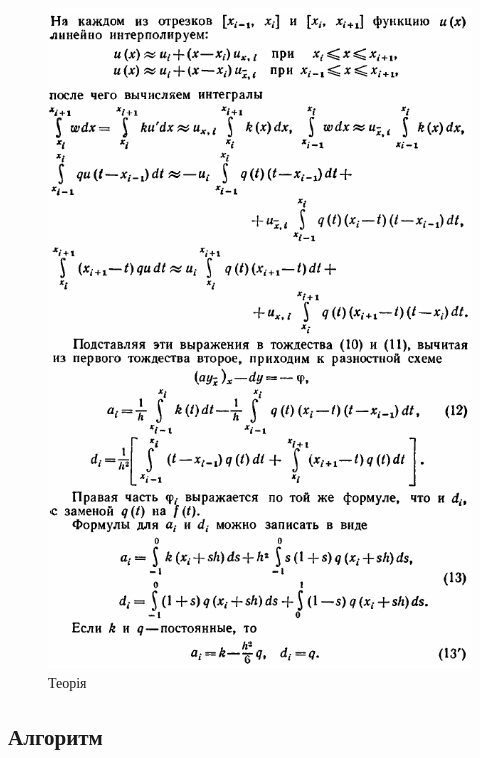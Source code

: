 \documentclass[fontsize=14pt,DIV=1,a4paper]{scrartcl}
\begin{document}
	\begin{figure}[h!]
		\includegraphics[scale=0.6]{iim_th2.png}
		\centering
		\caption{Теорія}
	\end{figure}
	
	\newpage
	\textbf{}
			
	\newpage
	\subsection{Алгоритм}
	
\end{document}
